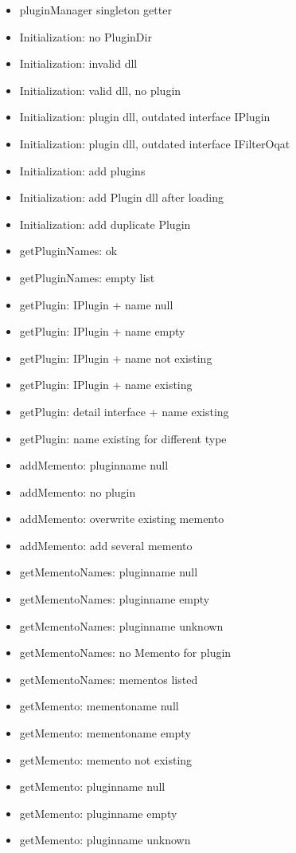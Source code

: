 \begin{itemize}
\item pluginManager singleton getter
\item Initialization: no PluginDir
\item Initialization: invalid dll
\item Initialization: valid dll, no plugin
\item Initialization: plugin dll, outdated interface IPlugin
\item Initialization: plugin dll, outdated interface IFilterOqat
\item Initialization: add plugins
\item Initialization: add Plugin dll after loading
\item Initialization: add duplicate Plugin

\item getPluginNames: ok
\item getPluginNames: empty list
\item getPlugin: IPlugin + name null
\item getPlugin: IPlugin + name empty
\item getPlugin: IPlugin + name not existing
\item getPlugin: IPlugin + name existing
\item getPlugin: detail interface + name existing
\item getPlugin: name existing for different type

\item addMemento: pluginname null
\item addMemento: no plugin
\item addMemento: overwrite existing memento
\item addMemento: add several memento
\item getMementoNames: pluginname null
\item getMementoNames: pluginname empty
\item getMementoNames: pluginname unknown
\item getMementoNames: no Memento for plugin
\item getMementoNames: mementos listed

\item getMemento: mementoname null
\item getMemento: mementoname empty
\item getMemento: memento not existing
\item getMemento: pluginname null
\item getMemento: pluginname empty
\item getMemento: pluginname unknown
\end{itemize}

